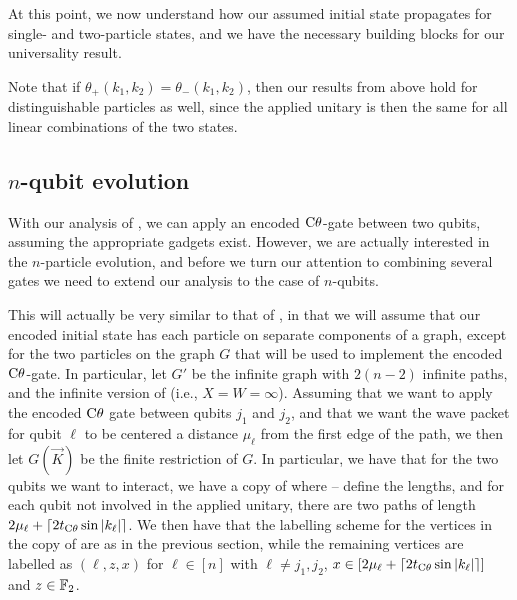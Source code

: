 \documentclass[../thesis-main/thesis-main]{subfiles}
\begin{document}
At this point, we now understand how our assumed initial state propagates for single- and two-particle states, and we have the necessary building blocks for our universality result.  

Note that if $\theta_{+}(k_1,k_2) = \theta_{-}(k_1,k_2)$, then our results from above hold for distinguishable particles as well, since the applied unitary is then the same for all linear combinations of the two states.

\subsection{$n$-qubit evolution}

With our analysis of , we can apply an encoded $\mathrm{C}\theta$-gate between two qubits, assuming the appropriate gadgets exist.  However, we are actually interested in the $n$-particle evolution, and before we turn our attention to combining several gates we need to extend our analysis to the case of $n$-qubits.

This will actually be very similar to that of , in that we will assume that our encoded initial state has each particle on separate components of a graph, except for the two particles on the graph $G$ that will be used to implement the encoded $\mathrm{C}\theta$-gate.  In particular,  let $G'$ be the infinite graph with $2(n-2)$ infinite paths, and the infinite version of  (i.e., $X = W = \infty$).  Assuming that we want to apply the encoded $\mathrm{C}\theta$ gate between qubits $j_1$ and $j_2$, and that we want the wave packet for qubit $\ell$ to be centered a distance $\mu_\ell$ from the first edge of the path, we then let $G(\vec{K})$ be the finite restriction of $G$.  In particular, we have that for the two qubits we want to interact, we have a copy of  where -- define the lengths, and for each qubit not involved in the applied unitary, there are two paths of length $2\mu_\ell + \lceil 2 t_{\mathrm{C}\theta} \sin |k_\ell |\rceil$.  We then have that the labelling scheme for the vertices in the copy of  are as in the previous section, while the remaining vertices are labelled as $(\ell,z,x)$ for $\ell\in [n]$ with $\ell\neq j_1,j_2$, $x\in [2\mu_\ell + \lceil 2 t_{\mathrm{C}\theta} \sin |k_\ell |\rceil]$ and $z\in \mathbb{F}_2$.
\end{document}
